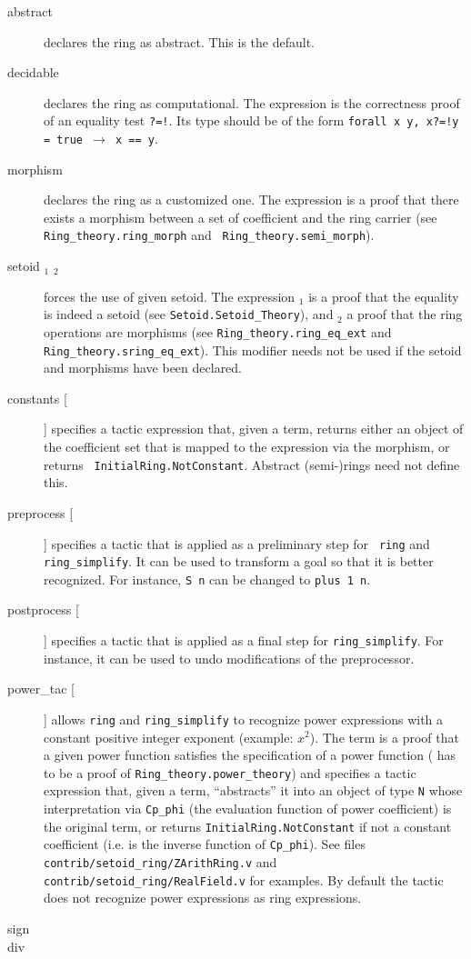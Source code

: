 \begin{description}
\item[abstract] declares the ring as abstract. This is the default.
\item[decidable \term] declares the ring as computational. The expression 
  \term{} is
  the correctness proof of an equality test {\tt ?=!}. Its type should be of
  the form {\tt forall x y, x?=!y = true $\rightarrow$ x == y}.
\item[morphism \term] declares the ring as a customized one. The expression 
  \term{} is
  a proof that there exists a morphism between a set of coefficient
  and the ring carrier (see {\tt Ring\_theory.ring\_morph} and {\tt
  Ring\_theory.semi\_morph}).
\item[setoid \term$_1$ \term$_2$] forces the use of given setoid. The 
  expression \term$_1$ is a proof that the equality is indeed a setoid
  (see {\tt Setoid.Setoid\_Theory}), and \term$_2$ a proof that the
  ring operations are morphisms (see {\tt Ring\_theory.ring\_eq\_ext} and
  {\tt Ring\_theory.sring\_eq\_ext}). This modifier needs not be used if the
  setoid and morphisms have been declared.
\item[constants [\ltac]] specifies a tactic expression that, given a term,
  returns either an object of the coefficient set that is mapped to
  the expression via the morphism, or returns {\tt
  InitialRing.NotConstant}. Abstract (semi-)rings need not define this.
\item[preprocess [\ltac]]
  specifies a tactic that is applied as a preliminary step for {\tt
  ring} and {\tt ring\_simplify}. It can be used to transform a goal
  so that it is better recognized. For instance, {\tt S n} can be
  changed to {\tt plus 1 n}.
\item[postprocess [\ltac]] specifies a tactic that is applied as a final step
  for {\tt ring\_simplify}. For instance, it can be used to undo
  modifications of the preprocessor.
\item[power\_tac {\term} [\ltac]] allows {\tt ring} and {\tt ring\_simplify} to
  recognize power expressions with a constant positive integer exponent 
  (example: $x^2$). The term {\term} is a proof that a given power function
  satisfies the specification of a power function ({\term} has to be a
  proof of {\tt Ring\_theory.power\_theory}) and {\ltac} specifies a
  tactic expression that, given a term, ``abstracts'' it into an
  object of type {\tt N} whose interpretation via {\tt Cp\_phi} (the
  evaluation function of power coefficient) is the original term, or
  returns {\tt InitialRing.NotConstant} if not a constant coefficient
  (i.e. {\ltac} is the inverse function of {\tt Cp\_phi}).
  See files {\tt contrib/setoid\_ring/ZArithRing.v} and
  {\tt contrib/setoid\_ring/RealField.v} for examples.
  By default the tactic does not recognize power expressions as ring
  expressions.
\item[sign {\term}]
\item[div {\term}]
  
  
\end{description}


